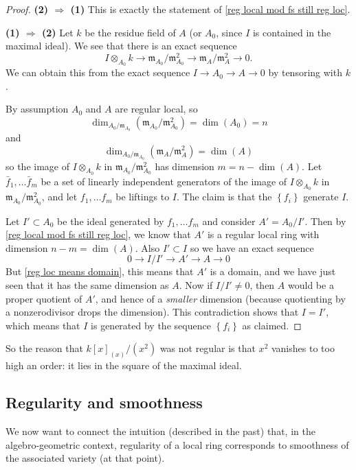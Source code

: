 \begin{proof} \textbf{(2) $\Rightarrow$ (1)} This is exactly the statement of
\cref{reg local mod fs still reg loc}.

\noindent \textbf{(1) $\Rightarrow$ (2)} 
Let $k$ be the residue field of $A$ (or $A_0$, since $I$ is contained in the
maximal ideal).
We see that there is an exact sequence
\[I \otimes_{A_0} k \to \mathfrak{m}_{A_0}/\mathfrak{m}_{A_0}^2 \to \mathfrak{m}_{A}/\mathfrak{m}_{A}^2  \to 0.\]
We can obtain this from the exact sequence $I \to A_0 \to A \to 0$ by tensoring
with $k$. 

By assumption $A_0$ and $A$ are regular local, so
\[\dim_{A_0/\mathfrak{m}_{A_0}}(\mathfrak{m}_{A_0}/\mathfrak{m}_{A_0}^2)=\dim(A_0)=n\]
and
\[\dim_{A_0/\mathfrak{m}_{A_0}}(\mathfrak{m}_{A}/\mathfrak{m}_{A}^2)=\dim(A)\]
so the image of $I\otimes_{A_0} k$ in $\mathfrak{m}_{A_0}/\mathfrak{m}_{A_0}^2$
has dimension $m=n-\dim(A)$. Let $\bar{f}_1, \ldots \bar{f}_m$ be a set of
linearly independent generators of the image of $I
\otimes_{A_0} k$ in $\mathfrak{m}_{A_0}/\mathfrak{m}_{A_0}^2$, and let $f_1, \ldots f_m$ be liftings to $I$.
The claim is that the $\left\{f_i\right\}$ generate $I$. 

Let $I' \subset A_0$ be the ideal generated by $f_1, \ldots f_m$ and consider
$A'=A_0/I'$. Then by \cref{reg local mod fs still reg loc}, we know that $A'$
is a regular local ring with dimension $n-m=\dim(A)$. Also $I' \subset I$ so we
have an exact sequence
\[0 \to I/I' \to A' \to A \to 0\]
But  \cref{reg loc means domain}, this means that $A'$ is a domain, and we
have just seen that it has the same dimension as $A$. 
Now if $I/I' \neq 0$, then $A$ would be a proper quotient of $A'$, and hence of
a \emph{smaller} dimension (because quotienting by a nonzerodivisor drops the
dimension). This contradiction shows that $I = I'$, which means that $I$ is
generated by the sequence $\left\{f_i\right\}$ as claimed.
\end{proof}

So the reason that $k[x]_{(x)}/(x^2)$ was not regular is that $x^2$ vanishes to
too high an order: it lies in the square of the maximal ideal.

\subsection{Regularity and smoothness}
\newcommand{\maxspec}{\mathrm{MaxSpec}}

We now want to connect the intuition (described in the past) that, in the
algebro-geometric context, regularity of a local ring corresponds to smoothness
of the associated variety (at that point).

